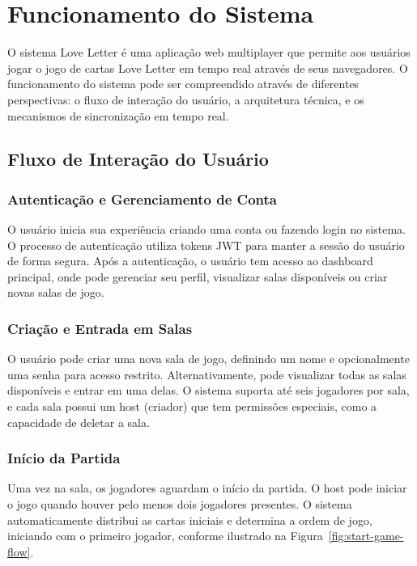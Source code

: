 \chapter{Funcionamento do Sistema}

O sistema Love Letter é uma aplicação web multiplayer que permite aos usuários jogar o jogo de cartas Love Letter em tempo real através de seus navegadores. O funcionamento do sistema pode ser compreendido através de diferentes perspectivas: o fluxo de interação do usuário, a arquitetura técnica, e os mecanismos de sincronização em tempo real.

\section{Fluxo de Interação do Usuário}

\subsection{Autenticação e Gerenciamento de Conta}
O usuário inicia sua experiência criando uma conta ou fazendo login no sistema. O processo de autenticação utiliza tokens JWT para manter a sessão do usuário de forma segura. Após a autenticação, o usuário tem acesso ao dashboard principal, onde pode gerenciar seu perfil, visualizar salas disponíveis ou criar novas salas de jogo.

\subsection{Criação e Entrada em Salas}
O usuário pode criar uma nova sala de jogo, definindo um nome e opcionalmente uma senha para acesso restrito. Alternativamente, pode visualizar todas as salas disponíveis e entrar em uma delas. O sistema suporta até seis jogadores por sala, e cada sala possui um host (criador) que tem permissões especiais, como a capacidade de deletar a sala.

\subsection{Início da Partida}
Uma vez na sala, os jogadores aguardam o início da partida. O host pode iniciar o jogo quando houver pelo menos dois jogadores presentes. O sistema automaticamente distribui as cartas iniciais e determina a ordem de jogo, iniciando com o primeiro jogador, conforme ilustrado na Figura~\ref{fig:start-game-flow}.

